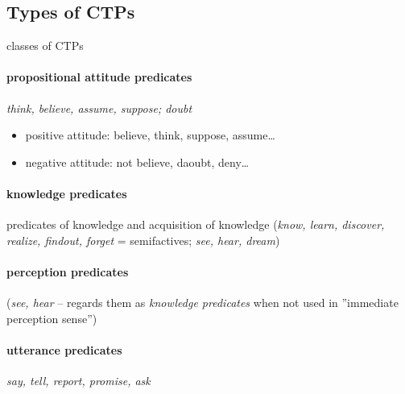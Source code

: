 \documentclass[a4,12pt]{scrartcl}
\begin{document}
\subsection{Types of CTPs}%
classes of CTPs \cite{noonan2007}
\paragraph {\bf propositional attitude predicates} {\it think, believe, assume, suppose; doubt}
\begin{itemize}
\item positive attitude: believe, think, suppose, assume\dots
\item negative attitude: not believe, daoubt, deny\dots
\end{itemize}


\paragraph {\bf knowledge predicates} predicates of knowledge and acquisition of knowledge ({\it know, learn, discover, realize, findout, forget} = semifactives; {\it see, hear, dream})  \cite[3.2.5]{noonan2007}



\paragraph {\bf perception predicates} ({\it see, hear} – \cite[3.2.5]{noonan2007} regards them as {\it knowledge predicates} when not used in ''immediate perception sense'')

\paragraph {\bf utterance predicates} {\it say, tell, report, promise, ask} 
\end{document}
